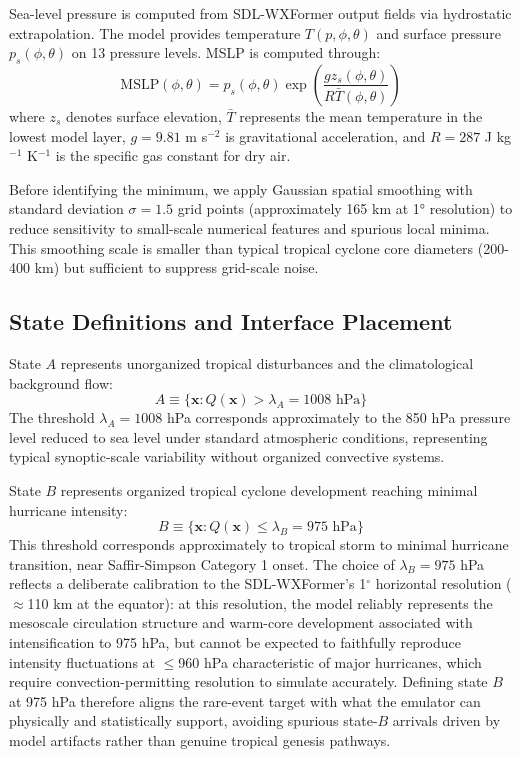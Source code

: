\documentclass[11pt]{article}
\begin{document}
Sea-level pressure is computed from SDL-WXFormer output fields via hydrostatic extrapolation. The model provides temperature $T(p, \phi, \theta)$ and surface pressure $p_s(\phi, \theta)$ on 13 pressure levels. MSLP is computed through:
\begin{equation}
\text{MSLP}(\phi, \theta) = p_s(\phi, \theta) \exp\left(\frac{g z_s(\phi, \theta)}{R \bar{T}(\phi, \theta)}\right)
\end{equation}
where $z_s$ denotes surface elevation, $\bar{T}$ represents the mean temperature in the lowest model layer, $g = 9.81$ m s$^{-2}$ is gravitational acceleration, and $R = 287$ J kg$^{-1}$ K$^{-1}$ is the specific gas constant for dry air.

Before identifying the minimum, we apply Gaussian spatial smoothing with standard deviation $\sigma = 1.5$ grid points (approximately 165 km at 1° resolution) to reduce sensitivity to small-scale numerical features and spurious local minima. This smoothing scale is smaller than typical tropical cyclone core diameters (200-400 km) but sufficient to suppress grid-scale noise.

\subsection{State Definitions and Interface Placement}

State $A$ represents unorganized tropical disturbances and the climatological background flow:
\begin{equation}
A \equiv \{\mathbf{x} : Q(\mathbf{x}) > \lambda_A = 1008 \text{ hPa}\}
\end{equation}
The threshold $\lambda_A = 1008$ hPa corresponds approximately to the 850 hPa pressure level reduced to sea level under standard atmospheric conditions, representing typical synoptic-scale variability without organized convective systems.

State $B$ represents organized tropical cyclone development reaching minimal hurricane intensity:
\begin{equation}
B \equiv \{\mathbf{x} : Q(\mathbf{x}) \leq \lambda_B = 975 \text{ hPa}\}
\end{equation}
This threshold corresponds approximately to tropical storm to minimal hurricane transition, near Saffir-Simpson Category 1 onset. The choice of $\lambda_B = 975$ hPa reflects a deliberate calibration to the SDL-WXFormer's 1$^\circ$ horizontal resolution ($\approx$110 km at the equator): at this resolution, the model reliably represents the mesoscale circulation structure and warm-core development associated with intensification to 975 hPa, but cannot be expected to faithfully reproduce intensity fluctuations at $\leq$960 hPa characteristic of major hurricanes, which require convection-permitting resolution to simulate accurately. Defining state $B$ at 975 hPa therefore aligns the rare-event target with what the emulator can physically and statistically support, avoiding spurious state-$B$ arrivals driven by model artifacts rather than genuine tropical genesis pathways.
\end{document}
